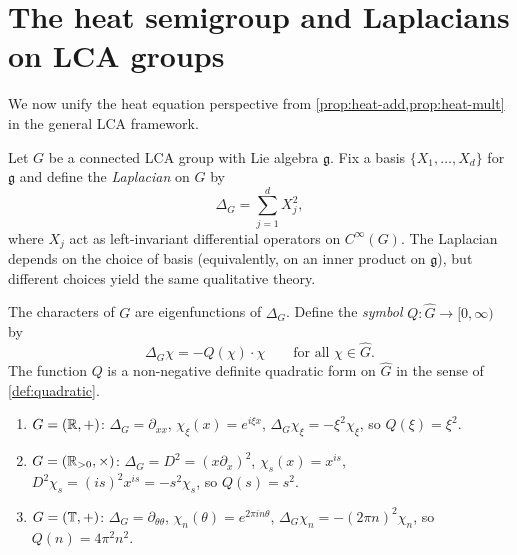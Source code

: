 \section{The heat semigroup and Laplacians on LCA groups}

We now unify the heat equation perspective from \cref{prop:heat-add,prop:heat-mult} in the general LCA framework.

\begin{definition}\label{def:laplacian}
Let $G$ be a connected LCA group with Lie algebra $\mathfrak{g}$. Fix a basis $\{X_1, \ldots, X_d\}$ for $\mathfrak{g}$ and define the \emph{Laplacian} on $G$ by
\[
\Delta_G = \sum_{j=1}^d X_j^2,
\]
where $X_j$ act as left-invariant differential operators on $C^\infty(G)$. The Laplacian depends on the choice of basis (equivalently, on an inner product on $\mathfrak{g}$), but different choices yield the same qualitative theory.
\end{definition}

The characters of $G$ are eigenfunctions of $\Delta_G$. Define the \emph{symbol} $Q : \widehat{G} \to [0, \infty)$ by
\begin{equation}\label{eq:symbol}
\Delta_G \chi = -Q(\chi) \cdot \chi \qquad \text{for all } \chi \in \widehat{G}.
\end{equation}
The function $Q$ is a non-negative definite quadratic form on $\widehat{G}$ in the sense of \cref{def:quadratic}.

\begin{example}\label{ex:laplacian-symbol}
\begin{enumerate}[label=(\alph*)]
\item $G = (\mathbb{R}, +)$: $\Delta_G = \partial_{xx}$, $\chi_\xi(x) = e^{i\xi x}$, $\Delta_G \chi_\xi = -\xi^2 \chi_\xi$, so $Q(\xi) = \xi^2$.
\item $G = (\mathbb{R}_{>0}, \times)$: $\Delta_G = D^2 = (x\partial_x)^2$, $\chi_s(x) = x^{is}$, $D^2 \chi_s = (is)^2 x^{is} = -s^2 \chi_s$, so $Q(s) = s^2$.
\item $G = (\mathbb{T}, +)$: $\Delta_G = \partial_{\theta\theta}$, $\chi_n(\theta) = e^{2\pi i n\theta}$, $\Delta_G \chi_n = -(2\pi n)^2 \chi_n$, so $Q(n) = 4\pi^2 n^2$.
\end{enumerate}
\end{example}

